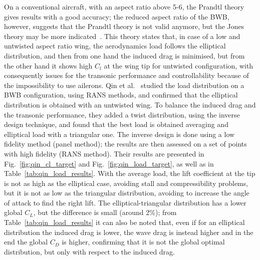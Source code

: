 On a conventional aircraft, with an aspect ratio above 5-6, the Prandtl theory gives results with a good accuracy; the reduced aspect ratio of the BWB, however, suggests that the Prandtl theory is not valid anymore, but the Jones theory may be more indicated~\cite{bib:cdn_notes}. 
This theory states that, in case of a low and untwisted aspect ratio wing, the aerodynamics load follows the elliptical distribution, and then from one hand the induced drag is minimised, but from the other hand it shows high $C_l$ at the wing tip for untwisted configuration, with consequently issues for the transonic performance and controllability because of the impossibility to use ailerons. 
Qin et al.~\cite{bib:qin} studied the load distribution on a BWB configuration, using RANS methods, and confirmed that the elliptical distribution is obtained with an untwisted wing. 
To balance the induced drag and the transonic performance, they added a twist distribution, using the inverse design technique, and found that the best load is obtained averaging and elliptical load with a triangular one. 
The inverse design is done using a low fidelity method (panel method); the results are then assessed on a set of points with high fidelity (RANS method).
Their results are presented in Fig.~\ref{fig:qin_cl_target} and Fig.~\ref{fig:qin_load_target}, as well as in Table~\ref{tab:qin_load_results}. 
With the average load, the lift coefficient at the tip is not as high as the elliptical case, avoiding stall and compressibility problems, but it is not as low as the triangular distribution, avoiding to increase the angle of attack to find the right lift. The elliptical-triangular distribution has a lower global $C_L$, but the difference is small (around 2\%); from Table~\ref{tab:qin_load_results} it can also be noted that, even if for an elliptical distribution the induced drag is lower, the wave drag is instead higher and in the end the global $C_D$ is higher, confirming that it is not the global optimal distribution, but only with respect to the induced drag. 
